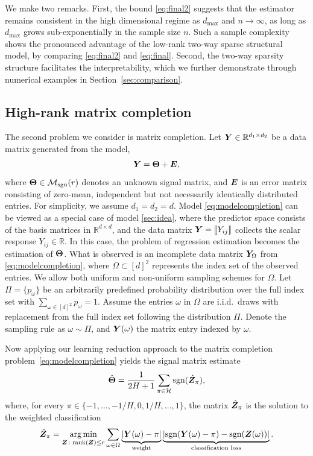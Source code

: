 \documentclass[11pt]{article}
\newcommand*{\KeepStyleUnderBrace}[1]{%
\mathop{%
\mathchoice
{\underbrace{\displaystyle#1}}%
{\underbrace{\textstyle#1}}%
{\underbrace{\scriptstyle#1}}%
{\underbrace{\scriptscriptstyle#1}}%
}\limits
}
\theoremstyle{plain}
\theoremstyle{definition}
\def\caliM{\tM_{\textup{sgn}}}
\def\sign{\textup{sgn}}
\def\rank{\textup{rank}}
\def\caliM{\tM_{\textup{sgn}}}
\begin{document}
\noindent
We make two remarks. First, the bound \eqref{eq:final2} suggests that the estimator remains consistent in the high dimensional regime as $d_{\max}$ and $n\to \infty$, as long as $d_{\max}$ grows sub-exponentially in the sample size $n$. Such a sample complexity shows the pronounced advantage of the low-rank two-way sparse structural model, by comparing \eqref{eq:final2} and \eqref{eq:final}. Second, the two-way sparsity structure facilitates the interpretability, which we further demonstrate through numerical examples in Section~\ref{sec:comparison}. 



\subsection{High-rank matrix completion}\label{sec:matrixcompletion}

The second problem we consider is matrix completion. Let $\bm Y\in\mathbb{R}^{d_1\times d_2}$ be a data matrix generated from the model,
\begin{equation}\label{eq:modelcompletion}
\bm Y=\bm{\Theta}+\bm{E},
\end{equation}
where $\mTheta\in\caliM(r)$ denotes an unknown signal matrix, and $\bm{E}$ is an error matrix consisting of zero-mean, independent but not necessarily identically distributed entries. For simplicity, we assume $d_1=d_2=d$. Model \eqref{eq:modelcompletion} can be viewed as a special case of model \eqref{sec:idea}, where the predictor space consists of the basis matrices in $\mathbb{R}^{d\times d}$, and the data matrix $\bm Y=\llbracket Y_{ij} \rrbracket$ collects the scalar response $Y_{ij} \in \mathbb{R}$. In this case, the problem of regression estimation becomes the estimation of $\bm{\Theta}$. What is observed is an incomplete data matrix $\bm Y_\Omega$ from \eqref{eq:modelcompletion}, where $\Omega \subset [d]^2$ represents the index set of the observed entries. We allow both uniform and non-uniform sampling schemes for $\Omega$. Let $\Pi=\{p_\omega\}$ be an arbitrarily predefined probability distribution over the full index set with $\sum_{\omega\in[d]^2}p_\omega=1$. Assume the entries $\omega$ in $\Omega$ are i.i.d.\ draws with replacement from the full index set following the distribution $\Pi$. Denote the sampling rule as $\omega \sim \Pi$, and $\bm Y(\omega)$ the matrix entry indexed by $\omega$.  

Now applying our learning reduction approach to the matrix completion problem~\eqref{eq:modelcompletion} yields the signal matrix estimate
\begin{equation}\label{eq:est}
\hat \mTheta = {1\over 2H+1}\sum_{\pi \in \tH}\sign(\hat \mZ_\pi),
\end{equation}
where, for every $\pi\in\{-1,\ldots,-1/H,0,1/H,\ldots,1\}$, the matrix $\hat {\bm Z}_\pi$ is the solution to the weighted classification
\begin{equation*}
\hat \mZ_\pi = \argmin_{\mZ\colon \rank(\mZ)\leq r}\sum_{\omega\in\Omega} \KeepStyleUnderBrace{|\mY(\omega)-\pi|}_{\text{weight}}\KeepStyleUnderBrace{|\sign(\mY(\omega)-\pi)-\sign(\mZ(\omega))|}_{\text{classification loss}}.
\end{equation*}
\end{document}
